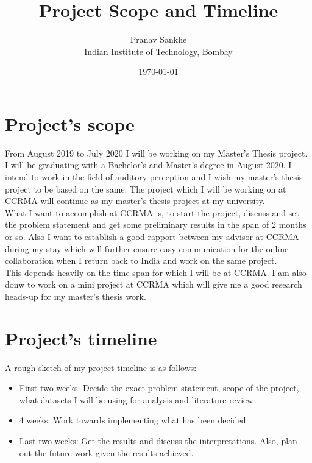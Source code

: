 \documentclass[a4paper]{article}
\title{Project Scope and Timeline}
\author{Pranav Sankhe \\ Indian Institute of Technology, Bombay}
\date{\today}
\begin{document}
\maketitle


\section*{Project's scope}

From August 2019 to July 2020 I will be working on my Master's Thesis project. I will be graduating with a Bachelor's and Master's degree in August 2020.
I intend to work in the field of auditory perception and I wish my master's thesis project to be based on the same. The project which I will be working on at CCRMA will continue as my master's thesis project at my university. \\

What I want to accomplish at CCRMA is, to start the project, discuss and set the problem statement and get some preliminary results in the span of 2 months or so. Also I want to establish a good rapport between my advisor at CCRMA during my stay which will further ensure easy communication for the online collaboration when I return back to India and work on the same project. \\ 

This depends heavily on the time span for which I will be at CCRMA. I am also donw to work on a mini project at CCRMA which will give me a good research heads-up for my master's thesis work.


\section*{Project's timeline}
A rough sketch of my project timeline is as follows:
\begin{itemize}
\item First two weeks: Decide the exact problem statement, scope of the project, what datasets I will be using for analysis and literature review 
\item 4 weeks: Work towards implementing what has been decided
\item Last two weeks: Get the results and discuss the interpretations. Also, plan out the future work given the results achieved.    
\end{itemize}
\end{document}
